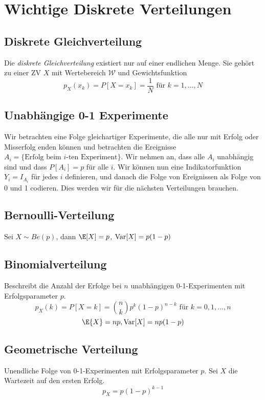 \section{Wichtige Diskrete Verteilungen}

\subsection{Diskrete Gleichverteilung}
Die \textit{diskrete Gleichverteilung} existiert nur auf einer endlichen Menge. Sie gehört zu einer ZV $X$ mit Wertebereich $\mathcal{W}$ und Gewichtsfunktion 
$$p_X(x_k) = P[X=x_k]=\frac{1}{N} \mbox{   für } k=1,\dots, N$$

\subsection{Unabhängige 0-1 Experimente}
Wir betrachten eine Folge gleichartiger Experimente, die alle nur mit Erfolg oder Misserfolg enden können und betrachten die Ereignisse $A_i = \{\mbox{Erfolg beim }i\mbox{-ten Experiment}\}$. Wir nehmen an, dass alle $A_i$ unabhängig sind und dass $P[A_i]=p$ für alle $i$. Wir können nun eine Indikatorfunktion $Y_i = I_{A_i}$ für jedes $i$ definieren, und danach die Folge von Ereignissen als Folge von 0 und 1 codieren. Dies werden wir für die nächsten Verteilungen brauchen.

\subsection{Bernoulli-Verteilung}
Sei $X \sim Be(p)$, dann $\E[X] = p$, $\mbox{Var}[X]=p(1-p)$

\subsection{Binomialverteilung}
Beschreibt die Anzahl der Erfolge bei $n$ unabhängigen 0-1-Experimenten mit Erfolgsparameter $p$.
$$p_X(k)=P[X=k]=\binom{n}{k}p^k(1-p)^{n-k} \text{ für } k = 0,1,...,n$$
$$\E{X}=np, \Var[X]=np(1-p)$$

\subsection{Geometrische Verteilung}
Unendliche Folge von 0-1-Experimenten mit Erfolgsparameter $p$. Sei $X$ die Wartezeit auf den ersten Erfolg.
$$p_X=p(1-p)^{k-1}$$
